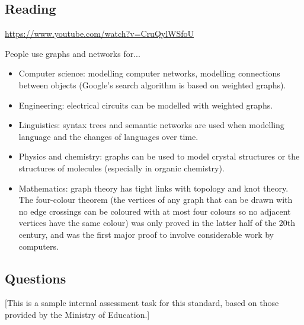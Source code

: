 



\subsection*{Reading}
\begin{center}
\begin{tcolorbox}[width=0.8\textwidth,colback={white},title={\textbf{Go and watch...}},colbacktitle=black,coltitle=white]
  \textcolor{black}{\url{https://www.youtube.com/watch?v=CruQylWSfoU}}
\end{tcolorbox}
\end{center}

\begin{center}
\begin{tcolorbox}[width=0.8\textwidth,colback={white},title={\textbf{What's it good for?}},colbacktitle=MidnightBlue,coltitle=white]
  People use graphs and networks for...
  \begin{itemize}
    \item Computer science: modelling computer networks, modelling connections between objects (Google's search algorithm is based on weighted graphs).
    \item Engineering: electrical circuits can be modelled with weighted graphs.
    \item Linguistics: syntax trees and semantic networks are used when modelling language and the changes of languages over time.
    \item Physics and chemistry: graphs can be used to model crystal structures or the structures of molecules (especially in organic chemistry).
    \item Mathematics: graph theory has tight links with topology and knot theory. The four-colour theorem (the vertices of any graph that can be
          drawn with no edge crossings can be coloured with at most four colours so no adjacent vertices have the same colour) was only proved in
          the latter half of the 20th century, and was the first major proof to involve considerable work by computers.
  \end{itemize}
\end{tcolorbox}
\end{center}

\clearpage
\subsection*{Questions}
[This is a sample internal assessment task for this standard, based on those provided by the Ministry of Education.]

